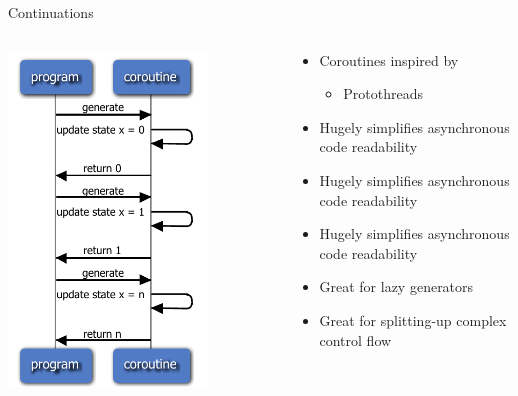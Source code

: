 \documentclass{beamer}
\begin{document}
\begin{frame}{Continuations}
    \begin{columns}
        \begin{column}{0.5\textwidth}
            \centerline{\includegraphics[width=0.75\textwidth]{design-intro.slides/coroutine_idea.pdf}}
        \end{column}
        \pause
        \begin{column}{0.5\textwidth}
            \begin{itemize}[<+->]
                \item Coroutines inspired by
                    \begin{itemize}[<+->]
                        \item Protothreads
                    \end{itemize}
                \item Hugely simplifies asynchronous code readability
                \item Hugely simplifies asynchronous code readability
                \item Hugely simplifies asynchronous code readability
                \item Great for lazy generators
                \item Great for splitting-up complex control flow
            \end{itemize}
        \end{column}
    \end{columns}
\end{frame}
\end{document}
